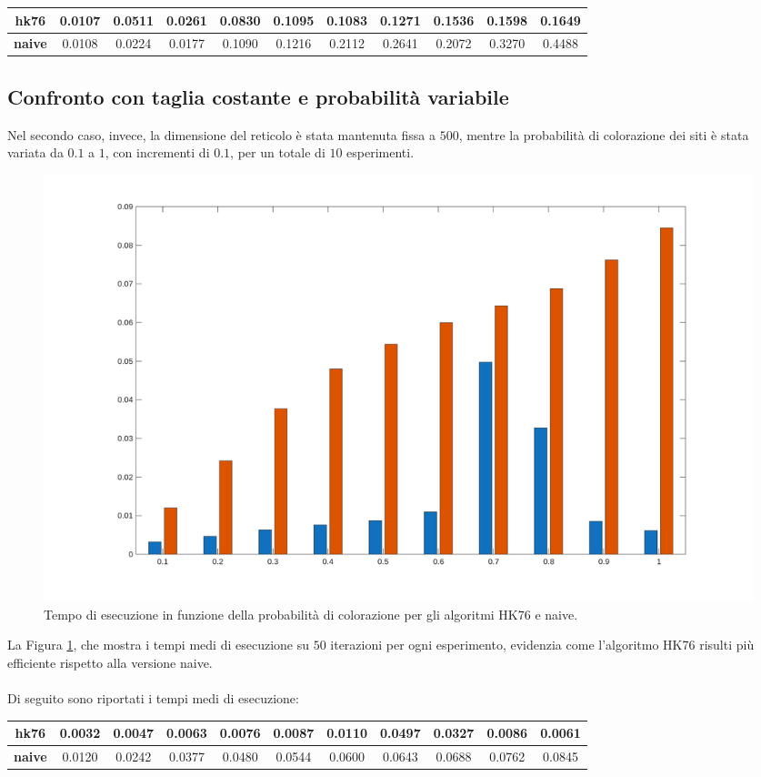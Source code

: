 \vspace{15px}
\noindent
\begin{tabular}{|c|*{10}{c|}}
	\hline
	\textbf{hk76}  & 0.0107  &  0.0511    &0.0261 &   0.0830   & 0.1095   & 0.1083  &  0.1271  &  0.1536  &  0.1598  &  0.1649\\
	\hline
	\textbf{naive}  &0.0108  &  0.0224  &  0.0177  &  0.1090  &  0.1216  &  0.2112   & 0.2641  &  0.2072&    0.3270  &  0.4488\\
	\hline
\end{tabular}

\subsection{Confronto con taglia costante e probabilità variabile}
Nel secondo caso, invece, la dimensione del reticolo è stata mantenuta fissa a $500$, mentre la probabilità di colorazione dei siti è stata variata da $0.1$ a $1$, con incrementi di $0.1$, per un totale di $10$ esperimenti. 

\begin{figure}[H]
	\centering
	\includegraphics[width=0.85\linewidth]{images/compare_p}
	\caption{Tempo di esecuzione in funzione della probabilità di colorazione per gli algoritmi HK76 e naive.}
	\label{fig:comparep}
\end{figure}

\noindent
La Figura \ref{fig:comparep}, che mostra i tempi medi di esecuzione su $50$ iterazioni per ogni esperimento, evidenzia come l’algoritmo HK76 risulti più efficiente rispetto alla versione naive. 
\\\\
\noindent
Di seguito sono riportati i tempi medi di esecuzione:

\vspace{15px}
\noindent
\begin{tabular}{|c|*{10}{c|}}
	\hline
	\textbf{hk76} &0.0032 &   0.0047 &   0.0063  &  0.0076 &   0.0087   &  0.0110   & 0.0497  &  0.0327    &0.0086    & 0.0061 \\
	\hline
	\textbf{naive} &0.0120 &   0.0242 &   0.0377   & 0.0480  &  0.0544 &   0.0600  &  0.0643  &  0.0688 &   0.0762 &   0.0845
	\\
	\hline
\end{tabular}

